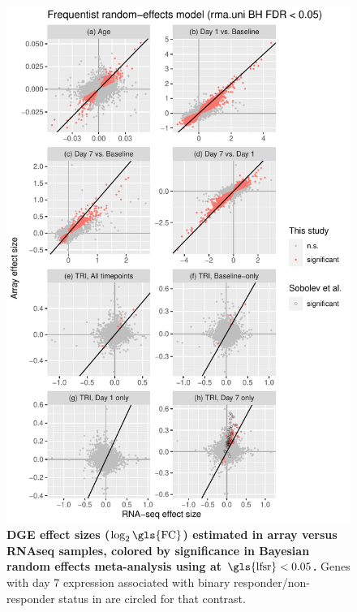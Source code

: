 \begin{figure}
    \includegraphics[width=1.0\textwidth,page=2]{mainmatter/figures/chapter_02/plot_dge_eqtl.DGE.effectSizeComparison.pdf}
    \caption{
        \textbf{\gls{DGE} effect sizes ($\log_2\text{\gls{FC}}$) estimated in array versus \gls{RNAseq} samples, colored by significance in Bayesian random effects meta-analysis using  at  $\text{\gls{lfsr}} < 0.05$.}
    Genes with day 7 expression associated with binary responder/non-responder status in \textcite{sobolev2016AdjuvantedInfluenzaH1N1Vaccination} are circled for that contrast.
    }
    \label{fig:hird_DGE_effectSizeComparisons_bayesmeta}
\end{figure}

